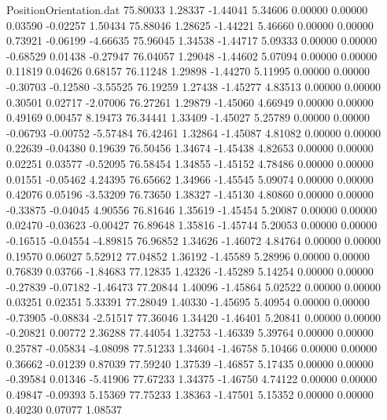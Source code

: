 \begin{filecontents}{PositionOrientation.dat}
  75.80033    1.28337   -1.44041     5.34606    0.00000    0.00000    0.03590   -0.02257    1.50434
  75.88046    1.28625   -1.44221     5.46660    0.00000    0.00000    0.73921   -0.06199   -4.66635
  75.96045    1.34538   -1.44717     5.09333    0.00000    0.00000   -0.68529    0.01438   -0.27947
  76.04057    1.29048   -1.44602     5.07094    0.00000    0.00000    0.11819    0.04626    0.68157
  76.11248    1.29898   -1.44270     5.11995    0.00000    0.00000   -0.30703   -0.12580   -3.55525
  76.19259    1.27438   -1.45277     4.83513    0.00000    0.00000    0.30501    0.02717   -2.07006
  76.27261    1.29879   -1.45060     4.66949    0.00000    0.00000    0.49169    0.00457    8.19473
  76.34441    1.33409   -1.45027     5.25789    0.00000    0.00000   -0.06793   -0.00752   -5.57484
  76.42461    1.32864   -1.45087     4.81082    0.00000    0.00000    0.22639   -0.04380    0.19639
  76.50456    1.34674   -1.45438     4.82653    0.00000    0.00000    0.02251    0.03577   -0.52095
  76.58454    1.34855   -1.45152     4.78486    0.00000    0.00000    0.01551   -0.05462    4.24395
  76.65662    1.34966   -1.45545     5.09074    0.00000    0.00000    0.42076    0.05196   -3.53209
  76.73650    1.38327   -1.45130     4.80860    0.00000    0.00000   -0.33875   -0.04045    4.90556
  76.81646    1.35619   -1.45454     5.20087    0.00000    0.00000    0.02470   -0.03623   -0.00427
  76.89648    1.35816   -1.45744     5.20053    0.00000    0.00000   -0.16515   -0.04554   -4.89815
  76.96852    1.34626   -1.46072     4.84764    0.00000    0.00000    0.19570    0.06027    5.52912
  77.04852    1.36192   -1.45589     5.28996    0.00000    0.00000    0.76839    0.03766   -1.84683
  77.12835    1.42326   -1.45289     5.14254    0.00000    0.00000   -0.27839   -0.07182   -1.46473
  77.20844    1.40096   -1.45864     5.02522    0.00000    0.00000    0.03251    0.02351    5.33391
  77.28049    1.40330   -1.45695     5.40954    0.00000    0.00000   -0.73905   -0.08834   -2.51517
  77.36046    1.34420   -1.46401     5.20841    0.00000    0.00000   -0.20821    0.00772    2.36288
  77.44054    1.32753   -1.46339     5.39764    0.00000    0.00000    0.25787   -0.05834   -4.08098
  77.51233    1.34604   -1.46758     5.10466    0.00000    0.00000    0.36662   -0.01239    0.87039
  77.59240    1.37539   -1.46857     5.17435    0.00000    0.00000   -0.39584    0.01346   -5.41906
  77.67233    1.34375   -1.46750     4.74122    0.00000    0.00000    0.49847   -0.09393    5.15369
  77.75233    1.38363   -1.47501     5.15352    0.00000    0.00000    0.40230    0.07077    1.08537

\end{filecontents}
